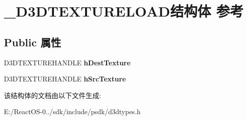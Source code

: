 \hypertarget{struct___d3_d_t_e_x_t_u_r_e_l_o_a_d}{}\section{\+\_\+\+D3\+D\+T\+E\+X\+T\+U\+R\+E\+L\+O\+A\+D结构体 参考}
\label{struct___d3_d_t_e_x_t_u_r_e_l_o_a_d}
\subsection*{Public 属性}
\begin{DoxyCompactItemize}
\item 
\mbox{\label{struct___d3_d_t_e_x_t_u_r_e_l_o_a_d_aebef3903eb4732be61dbcab5dc9416a7}} 
D3\+D\+T\+E\+X\+T\+U\+R\+E\+H\+A\+N\+D\+LE {\bfseries h\+Dest\+Texture}
\item 
\mbox{\label{struct___d3_d_t_e_x_t_u_r_e_l_o_a_d_a3acc6e60f741413e3f04a6b32918277d}} 
D3\+D\+T\+E\+X\+T\+U\+R\+E\+H\+A\+N\+D\+LE {\bfseries h\+Src\+Texture}
\end{DoxyCompactItemize}


该结构体的文档由以下文件生成\+:\begin{DoxyCompactItemize}
\item 
E\+:/\+React\+O\+S-\/0../sdk/include/psdk/d3dtypes.\+h\end{DoxyCompactItemize}
